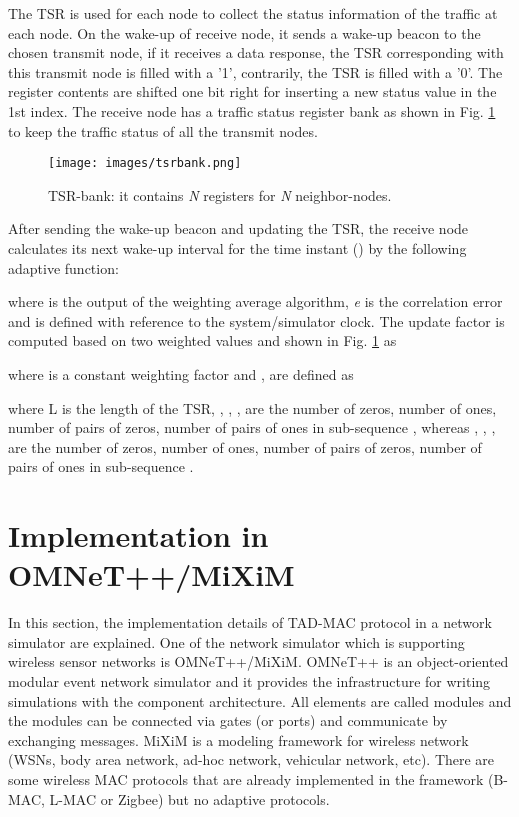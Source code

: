 \documentclass[conference]{IEEEtran}
\begin{document}
The TSR is used for each node to collect the status information of the traffic at each node. On the wake-up of receive node, it sends a wake-up beacon to the chosen transmit node, if it receives a data response, the TSR corresponding with this transmit node is filled with a '1', contrarily, the TSR is filled with a '0'. The register contents are shifted one bit right for inserting a new status value in the 1st index. The receive node has a traffic status register bank as shown in Fig. \ref{fig:tsrbank} to keep the traffic status of all the transmit nodes.

\begin{figure}[!t]
\centering
\texttt{[image: images/tsrbank.png]}
\caption{TSR-bank: it contains \textit{N} registers for \textit{N} neighbor-nodes.}
\label{fig:tsrbank}
\end{figure}

After sending the wake-up beacon and updating the TSR, the receive node calculates its next wake-up interval for the time instant () by the following adaptive function:

where \textit{} is the output of the weighting average algorithm, \textit{e} is the correlation error and \textit{} is defined with reference to the system/simulator clock. The update factor \textit{} is computed based on two weighted values \textit{} and \textit{} shown in Fig. \ref{fig:tsrbank} as

where \textit{} is a constant weighting factor and \textit{}, \textit{} are defined as


where L is the length of the TSR, \textit{}, \textit{}, \textit{}, \textit{} are the number of zeros, number of ones, number of pairs of zeros, number of pairs of ones in sub-sequence \textit{}, whereas \textit{}, \textit{}, \textit{}, \textit{} are the number of zeros, number of ones, number of pairs of zeros, number of pairs of ones in sub-sequence \textit{}.
\section{Implementation in OMNeT++/MiXiM}
\label{sec:implementation}
In this section, the implementation details of TAD-MAC protocol in a network simulator are explained. One of the network simulator which is supporting wireless sensor networks is OMNeT++/MiXiM. OMNeT++ is an object-oriented modular event network simulator and it provides the infrastructure for writing simulations with the component architecture. All elements are called modules and the modules can be connected via gates (or ports) and communicate by exchanging messages. MiXiM is a modeling framework for wireless network (WSNs, body area network, ad-hoc network, vehicular network, etc). There are some wireless MAC protocols that are already implemented in the framework (B-MAC, L-MAC or Zigbee) but no adaptive protocols.
\end{document}
